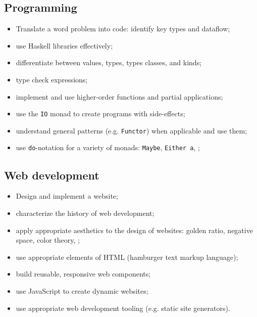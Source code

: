 \documentclass[11pt]{article}
\newcommand{\code}{\texttt}
\begin{document}
\subsection*{Programming}

\begin{itemize}
  \item Translate a word problem into code: identify key types and dataflow;
  \item use Haskell libraries effectively;
  \item differentiate between values, types, types classes, and kinds;
  \item type check expressions;
  \item implement and use higher-order functions and partial applications;
  \item use the \code{IO} monad to create programs with side-effects;
  \item understand general patterns (e.g. \code{Functor}) when applicable and
    use them;
  \item
    use \code{do}-notation for a variety of monads:
    \code{Maybe}, \code{Either a}, \textellipsis;
\end{itemize}

\subsection*{Web development}

\begin{itemize}
  \item Design and implement a website;
  \item characterize the history of web development;
  \item apply appropriate aesthetics to the design of websites:
    golden ratio, negative space, color theory, \textellipsis;
  \item use appropriate elements of HTML (hamburger text markup language);
  \item build reusable, responsive web components;
  \item use JavaScript to create dynamic websites;
  \item use appropriate web development tooling (e.g. static site generators).
\end{itemize}
\end{document}
